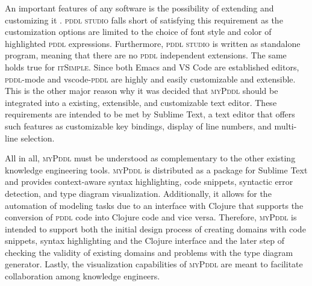 \documentclass[runningheads]{llncs}
\newcommand{\mypddl}{\textsc{myPddl}\xspace}
\newcommand{\pddlstudio}{\textsc{pddl studio}\xspace}
\newcommand{\itsimple}{\textsc{itSimple}\xspace}
\newcommand{\pddlmode}{\textsc{pddl}-mode\xspace}
\newcommand{\pddl}{\textsc{pddl}\xspace}
\begin{document}
An important features of any software is the possibility of extending
and customizing it \cite{hui2003requirements}. \pddlstudio falls short
of satisfying this requirement as the customization options are
limited to the choice of font style and color of highlighted \pddl
expressions. Furthermore, \pddlstudio is written as standalone
program, meaning that there are no \pddl independent extensions. The
same holds true for \itsimple. Since both Emacs and VS Code are
established editors, \pddlmode and vscode-\pddl are highly and easily
customizable and extensible. This is the other major reason why it was
decided that \mypddl should be integrated into a existing, extensible,
and customizable text editor. These requirements are intended to be
met by Sublime Text, a text editor that offers such features as
customizable key bindings, display of line numbers, and multi-line
selection.

All in all, \mypddl must be understood as complementary to the other
existing knowledge engineering tools. \mypddl is distributed as a
package for Sublime Text and provides context-aware syntax
highlighting, code snippets, syntactic error detection, and type
diagram visualization. Additionally, it allows for the automation of
modeling tasks due to an interface with Clojure that supports the
conversion of \textsc{pddl} code into Clojure code and vice
versa. Therefore, \mypddl is intended to support both the initial
design process of creating domains with code snippets, syntax
highlighting and the Clojure interface and the later step of checking
the validity of existing domains and problems with the type diagram
generator. Lastly, the visualization capabilities of \mypddl are meant
to facilitate collaboration among knowledge engineers.
\end{document}
